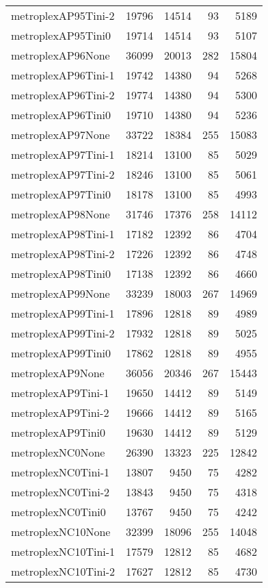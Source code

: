 \begin{longtable}{lrrrr}
metroplexAP95Tini-2 & 19796 & 14514 & 93 & 5189 \\
metroplexAP95Tini0 & 19714 & 14514 & 93 & 5107 \\
metroplexAP96None & 36099 & 20013 & 282 & 15804 \\
metroplexAP96Tini-1 & 19742 & 14380 & 94 & 5268 \\
metroplexAP96Tini-2 & 19774 & 14380 & 94 & 5300 \\
metroplexAP96Tini0 & 19710 & 14380 & 94 & 5236 \\
metroplexAP97None & 33722 & 18384 & 255 & 15083 \\
metroplexAP97Tini-1 & 18214 & 13100 & 85 & 5029 \\
metroplexAP97Tini-2 & 18246 & 13100 & 85 & 5061 \\
metroplexAP97Tini0 & 18178 & 13100 & 85 & 4993 \\
metroplexAP98None & 31746 & 17376 & 258 & 14112 \\
metroplexAP98Tini-1 & 17182 & 12392 & 86 & 4704 \\
metroplexAP98Tini-2 & 17226 & 12392 & 86 & 4748 \\
metroplexAP98Tini0 & 17138 & 12392 & 86 & 4660 \\
metroplexAP99None & 33239 & 18003 & 267 & 14969 \\
metroplexAP99Tini-1 & 17896 & 12818 & 89 & 4989 \\
metroplexAP99Tini-2 & 17932 & 12818 & 89 & 5025 \\
metroplexAP99Tini0 & 17862 & 12818 & 89 & 4955 \\
metroplexAP9None & 36056 & 20346 & 267 & 15443 \\
metroplexAP9Tini-1 & 19650 & 14412 & 89 & 5149 \\
metroplexAP9Tini-2 & 19666 & 14412 & 89 & 5165 \\
metroplexAP9Tini0 & 19630 & 14412 & 89 & 5129 \\
metroplexNC0None & 26390 & 13323 & 225 & 12842 \\
metroplexNC0Tini-1 & 13807 & 9450 & 75 & 4282 \\
metroplexNC0Tini-2 & 13843 & 9450 & 75 & 4318 \\
metroplexNC0Tini0 & 13767 & 9450 & 75 & 4242 \\
metroplexNC10None & 32399 & 18096 & 255 & 14048 \\
metroplexNC10Tini-1 & 17579 & 12812 & 85 & 4682 \\
metroplexNC10Tini-2 & 17627 & 12812 & 85 & 4730 \\

\end{longtable}
